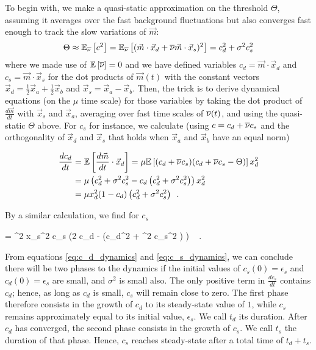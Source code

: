 To begin with, we make a quasi-static approximation on the threshold $\Theta$, assuming it averages over the fast background fluctuations but also converges fast enough to track the slow variations of $\vec{m}$:
\begin{equation*}
	\Theta \approx \mathbb{E}_{\overline{\nu}}\left[c^2\right] = \mathbb{E}_{\overline{\nu}}\left[(\vec{m} \cdot \vec{x}_d + \overline{\nu} \vec{m} \cdot \vec{x}_s)^2\right] = c_d^2 + \sigma^2 c_s^2
\end{equation*}
where we made use of $\mathbb{E}\left[ \overline{\nu} \right] = 0$ and we have defined variables $c_d = \vec{m} \cdot \vec{x}_d$ and $c_s = \vec{m} \cdot \vec{x}_s$ for the dot products of $\vec{m}(t)$ with the constant vectors $\vec{x}_d = \frac12 \vec{x}_a + \frac12 \vec{x}_b$ and $\vec{x}_s = \vec{x}_a - \vec{x}_b$. Then, the trick is to derive dynamical equations (on the $\mu$ time scale) for those variables by taking the dot product of $\frac{d \vec{m}}{dt}$ with $\vec{x}_s$ and $\vec{x}_a$, averaging over fast time scales of $\overline{\nu}(t)$, and using the quasi-static $\Theta$ above. For $c_s$ for instance, we calculate (using $c = c_d + \overline{\nu} c_s$ and the orthogonality of $\vec{x}_d$ and $\vec{x}_s$ that holds when $\vec{x}_a$ and $\vec{x}_b$ have an equal norm)

\begin{align}
	\frac{d c_d}{dt} &= \mathbb{E}\left[  \frac{d \vec{m}}{dt} \cdot \vec{x}_d \right] = \mu \mathbb{E}\left[ (c_d + \overline{\nu} c_s)(c_d + \overline{\nu} c_s - \Theta) \right] x_d^2  \nonumber \\
	&= \mu \left(c_d^2 + \sigma^2 c_s^2 - c_d \left(c_d^2 + \sigma^2 c_s^2 \right) \right) x_d^2 \nonumber \\
	&= \mu x_d^2 (1 - c_d)\left(c_d^2 + \sigma^2 c_s^2 \right) \,\,\, .
	\label{eq:c_d_dynamics}
\end{align}

By a similar calculation, we find for $c_s$

\beq
	 = \mu \sigma^2 x_s^2 c_s \left(2 c_d - \left(c_d^2 + \sigma^2 c_s^2 \right) \right) \,\,\, .
	\label{eq:c_s_dynamics}
\eeq

From equations \eqref{eq:c_d_dynamics} and \eqref{eq:c_s_dynamics}, we can conclude there will be two phases to the dynamics if the initial values of $c_s(0) = \epsilon_s$ and $c_d(0) = \epsilon_s$ are small, and $\sigma^2$ is small also. The only positive term in $\frac{d c_s}{dt}$ contains $c_d$; hence, as long as $c_d$ is small, $c_s$ will remain close to zero. The first phase therefore consists in the growth of $c_d$ to its steady-state value of $1$, while $c_s$ remains approximately equal to its initial value, $\epsilon_s$. We call $t_d$ its duration. After $c_d$ has converged, the second phase consists in the growth of $c_s$. We call $t_s$ the duration of that phase. Hence, $c_s$ reaches steady-state after a total time of $t_d + t_s$. 

